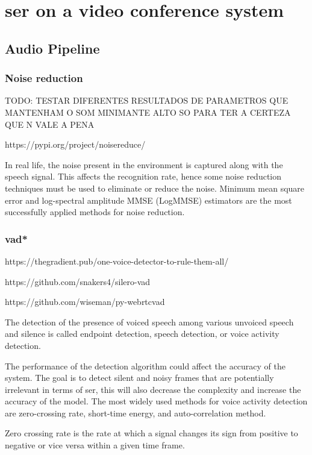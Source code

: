 \chapter{\acl{ser} on a video conference system}
\label{chapter:ser_conf}

\section{Audio Pipeline}



\subsection{Noise reduction}

TODO: TESTAR DIFERENTES RESULTADOS DE PARAMETROS QUE MANTENHAM O SOM MINIMANTE ALTO SO PARA TER A CERTEZA QUE N VALE A PENA

https://pypi.org/project/noisereduce/

In real life, the noise present in the environment is captured along with the speech signal. This affects the recognition rate, hence some noise reduction techniques must be used to eliminate or reduce the noise. Minimum mean square error and log-spectral amplitude MMSE (LogMMSE) estimators are the most successfully applied methods for noise reduction.


\subsection{\acl{vad*}}

https://thegradient.pub/one-voice-detector-to-rule-them-all/

https://github.com/snakers4/silero-vad

https://github.com/wiseman/py-webrtcvad

The detection of the presence of voiced speech among various unvoiced speech and silence is called endpoint detection, speech detection, or voice activity detection.

The performance of the detection algorithm could affect the accuracy of the system. The goal is to detect silent and noisy frames that are potentially irrelevant in terms of \ac{ser}, this will also decrease the complexity and increase the accuracy of the model. The most widely used methods for voice activity detection are zero-crossing rate, short-time energy, and auto-correlation method.

Zero crossing rate is the rate at which a signal changes its sign from positive to negative or vice versa within a given time frame.


